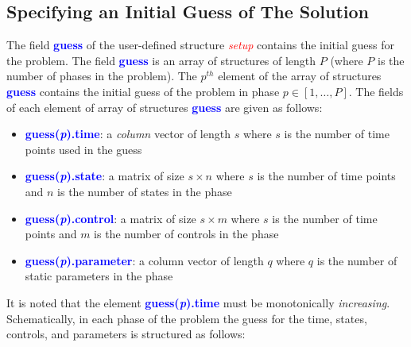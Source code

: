 \documentclass[10pt]{article}
\newcommand{\bfblue}[1]{\textcolor{blue}{\bf #1}}
\newcommand{\slred}[1]{\textcolor{red}{\sl #1}}
\begin{document}
\subsection{Specifying an Initial Guess of The Solution \label{sect:guess}}

The field \bfblue{guess} of the user-defined structure \slred{setup}
contains the initial guess for the problem.  The field
\bfblue{guess} is an array of structures of length $P$ (where $P$ is the
number of phases in the problem).  The $p^{th}$ element of the array
of structures \bfblue{guess} contains the initial guess of the problem in phase
$p\in[1,\ldots,P]$.  The fields of each element of array of structures
\bfblue{guess} are given as follows:
\begin{itemize}
\item \bfblue{guess(\textit{p}).time}:  a {\em column} vector of
  length $s$ where $s$ is the number of time points used in the guess
\item \bfblue{guess(\textit{p}).state}:  a matrix of size $s \times n$
  where $s$ is the number of time points and $n$ is the number of
  states in the phase
\item \bfblue{guess(\textit{p}).control}:  a matrix of size $s \times m$
  where $s$ is the number of time points and $m$ is the number of controls in the phase
\item \bfblue{guess(\textit{p}).parameter}:  a column vector of length $q$
  where $q$ is the number of static parameters in the phase
\end{itemize}
It is noted that the element \bfblue{guess(\textit{p}).time} must be
monotonically {\em increasing}.  Schematically, in each phase of the
problem the guess for the time, states, controls, and parameters is
structured as follows: 
\end{document}
